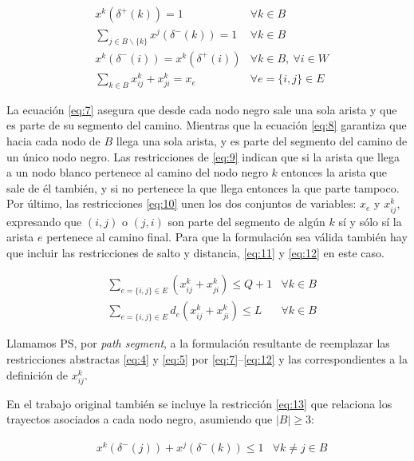 \documentclass[10pt, a4paper]{article}
\theoremstyle{definition}
\begin{document}
\begin{align} 
	& x^{k}\left(\delta^{+}(k)\right)=1 & \forall k \in B \label{eq:7} \\
	& \sum_{j \in B \backslash\{k\}} x^{j}\left(\delta^{-}(k)\right)=1 & \forall k \in B \label{eq:8} \\
	& x^{k}\left(\delta^{-}(i)\right)=x^{k}\left(\delta^{+}(i)\right) & \forall k \in B,\ \forall i \in W \label{eq:9} \\
	& \sum_{k \in B} x_{i j}^{k}+x_{j i}^{k}=x_{e} & \forall e=\{i, j\} \in E \label{eq:10}
\end{align}

La ecuación \ref{eq:7} asegura que desde cada nodo negro sale una sola arista y que es parte de su segmento del camino. Mientras que la ecuación \ref{eq:8} garantiza que hacia cada nodo de $B$ llega una sola arista, y es parte del segmento del camino de un único nodo negro. Las restricciones de \ref{eq:9} indican que si la arista que llega a un nodo blanco pertenece al camino del nodo negro $k$ entonces la arista que sale de él también, y si no pertenece la que llega entonces la que parte tampoco. Por último, las restricciones \ref{eq:10} unen los dos conjuntos de variables: $x_{e}$ y $x_{i j}^{k}$, expresando que $(i,j)$ o $(j,i)$ son parte del segmento de algún $k$ sí y sólo sí la arista $e$ pertenece al camino final. Para que la formulación sea válida también hay que incluir las restricciones de salto y distancia, \ref{eq:11} y \ref{eq:12} en este caso.

\begin{align} 
	& \sum_{e=\{i, j\} \in E}\left(x_{i j}^{k}+x_{j i}^{k}\right) \leq Q+1 & \forall k \in B \label{eq:11} \\
	& \sum_{e=\{i, j\} \in E} d_{e}\left(x_{i j}^{k}+x_{j i}^{k}\right) \leq L & \forall k \in B \label{eq:12}
\end{align}

Llamamos PS, por \textit{path segment}, a la formulación resultante de reemplazar las restricciones abstractas \ref{eq:4} y \ref{eq:5} por \ref{eq:7}–\ref{eq:12} y las correspondientes a la definición de $x_{i j}^{k}$.

En el trabajo original también se incluye la restricción \ref{eq:13} que relaciona los trayectos asociados a cada nodo negro, asumiendo que $|B| \geq 3$:

\begin{align}
	& x^{k}\left(\delta^{-}(j)\right)+x^{j}\left(\delta^{-}(k)\right) \leq 1 & \forall k \neq j \in B \label{eq:13}
\end{align}
\end{document}
